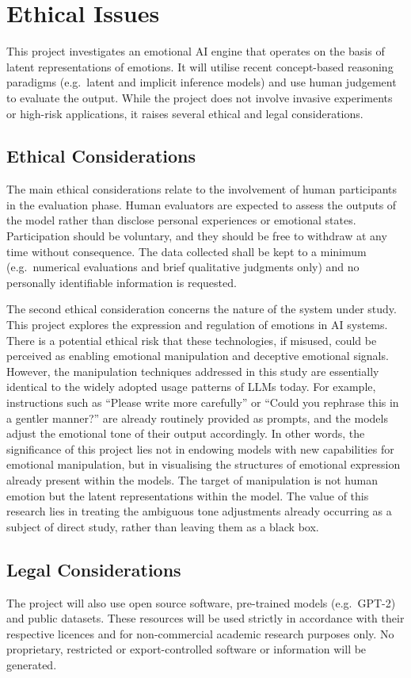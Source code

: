 \documentclass[12pt,twoside]{report}
\begin{document}
\chapter{Ethical Issues}

This project investigates an emotional AI engine that operates on the basis of latent representations of emotions. It will utilise recent concept-based reasoning paradigms (e.g.\ latent and implicit inference models) and use human judgement to evaluate the output. While the project does not involve invasive experiments or high-risk applications, it raises several ethical and legal considerations.

\section{Ethical Considerations}
The main ethical considerations relate to the involvement of human participants in the evaluation phase. Human evaluators are expected to assess the outputs of the model rather than disclose personal experiences or emotional states. Participation should be voluntary, and they should be free to withdraw at any time without consequence. The data collected shall be kept to a minimum (e.g.\ numerical evaluations and brief qualitative judgments only) and no personally identifiable information is requested.

The second ethical consideration concerns the nature of the system under study. This project explores the expression and regulation of emotions in AI systems. There is a potential ethical risk that these technologies, if misused, could be perceived as enabling emotional manipulation and deceptive emotional signals. However, the manipulation techniques addressed in this study are essentially identical to the widely adopted usage patterns of LLMs today. For example, instructions such as ``Please write more carefully'' or ``Could you rephrase this in a gentler manner?'' are already routinely provided as prompts, and the models adjust the emotional tone of their output accordingly. In other words, the significance of this project lies not in endowing models with new capabilities for emotional manipulation, but in visualising the structures of emotional expression already present within the models. The target of manipulation is not human emotion but the latent representations within the model. The value of this research lies in treating the ambiguous tone adjustments already occurring as a subject of direct study, rather than leaving them as a black box.

\section{Legal Considerations}

The project will also use open source software, pre-trained models (e.g.\ GPT-2) and public datasets. These resources will be used strictly in accordance with their respective licences and for non-commercial academic research purposes only. No proprietary, restricted or export-controlled software or information will be generated.



\end{document}
